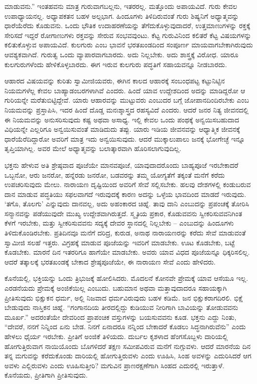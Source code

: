 ಮಾಡುವನು.” ಇಂತಹವನು ಮಾತ್ರ ಗುರುವಾಗಬಲ್ಲನು, ಇತರರಲ್ಲ. ಮತ್ತೊಂದು ಅಪಾಯವಿದೆ. ಗುರು ಕೇವಲ ಉಪಾಧ್ಯಾಯನಲ್ಲ. ಅಧ್ಯಾಪಕತನ ಬಹಳ ಅಲ್ಪಭಾಗ. ಹಿಂದೂಗಳು ತಿಳಿದಿರುವಂತೆ ಗುರು ಶಿಷ್ಯನಿಗೆ ಅಧ್ಯಾತ್ಮವನ್ನು ಧಾರೆಯೆರೆದು ಕೊಡುವನು. ಒಂದು ಭೌತಿಕ ಉದಾಹರಣೆಯನ್ನು ತೆಗೆದುಕೊಳ್ಳುವುದಾದರೆ, ಉತ್ತಮಾಣುಗಳನ್ನು ರಕ್ತಕ್ಕೆ ಸೇರಿಸದೆ ಇದ್ದರೆ ರೋಗಾಣುಗಳು ರಕ್ತವನ್ನು ಸೇರುವ ಸಂಭವವುಂಟು. ಕೆಟ್ಟ ಗುರುವಿನಿಂದ ಕಲಿತರೆ ಕೆಟ್ಟ ವಿಷಯಗಳನ್ನು ಕಲಿತುಕೊಳ್ಳುವ ಅಪಾಯವಿದೆ. ಕುಲಗುರು ಎಂಬ ಭಾವನೆ ಭರತಖಂಡದಿಂದ ಸಂಪೂರ್ಣ ಮಾಯವಾಗಬೇಕಾಗಿರುವುದು ಆವಶ್ಯಕವಾಗಿದೆ. ಗುರುತ್ವ ಒಂದು ವ್ಯಾಪಾರವಾಗಬಾರದು. ಅದು ನಿಲ್ಲಬೇಕು. ಅದು ಶಾಸ್ತ್ರಕ್ಕೆ ವಿರೋಧ. ಯಾರೂ ಕುಲಗುರುಗಳೆಂದು ಹೇಳಿಕೊಳ್ಳಬಾರದು. ಈಗ ಇರುವ ಕುಲಗುರು ಪದ್ಧತಿಗೆ ಸಹಾಯವನ್ನೂ ನೀಡಬಾರದು.

ಆಹಾರದ ವಿಷಯವನ್ನು ಕುರಿತು ಸ್ವಾಮೀಜಿಯವರು, ಈಗಿನ ಕಾಲದ ಆಹಾರಕ್ಕೆ ಸಂಬಂಧಪಟ್ಟ ಕಟ್ಟುನಿಟ್ಟಿನ ನಿಯಮಗಳೆಲ್ಲ ಕೇವಲ ಬಾಹ್ಯಾಡಂಬರಗಳಾಗಿವೆ ಎಂದರು. ಹಿಂದೆ ಯಾವ ಉದ್ದೇಶದಿಂದ ಅದನ್ನು ಮಾಡಿದ್ದರೋ ಆ ಗುರಿಯನ್ನೇ ಮರೆತುಬಿಟ್ಟಿದ್ದೇವೆ. ಯಾರು ಆಹಾರವನ್ನು ಮುಟ್ಟುವರು ಎಂಬುದರ ಬಗ್ಗೆ ಜೋಪಾನದಿಂದಿರಬೇಕು ಎಂಬ ನಿಯಮವನ್ನು ಪ್ರಸ್ತಾಪಿಸಿ, ಇದರ ಹಿಂದೆ ದೊಡ್ಡ ಮನಃಶ್ಶಾಸ್ತ್ರದ ರಹಸ್ಯವಿದೆ ಎಂದರು. ಆದರೆ ಜನರ ನಿತ್ಯ ಜೀವನದಲ್ಲಿ ಈ ನಿಯಮವನ್ನು ಅನುಸರಿಸುವುದು ಕಷ್ಟ ಅಥವಾ ಅಸಾಧ್ಯ. ಇಲ್ಲಿ ಕೇವಲ ಒಂದು ಪಂಥಕ್ಕೆ ಅನ್ವಯಿಸಬಹುದಾದ ವಿಧಿಯನ್ನೇ ಎಲ್ಲರಿಗೂ ಅನ್ವಯಿಸುವಂತೆ ಮಾಡಿದುದು ತಪ್ಪು. ಯಾರು ಇಡಿಯ ಜೀವನವನ್ನು ಆಧ್ಯಾತ್ಮಿಕ ಜೀವನಕ್ಕೆ ಧಾರೆಯೆರೆದಿದ್ದಾರೋ ಅವರಿಗೆ ಮಾತ್ರ ಇದು ಅನ್ವಯಿಸುವುದು. ಆದರೆ ಮುಕ್ಕಾಲುಪಾಲು ಜನಕ್ಕೆ ಭೋಗೇಚ್ಛೆ ಇನ್ನೂ ತೃಪ್ತಿಯಾಗಿಲ್ಲ. ಅವರ ಮೇಲೆ ಅಧ್ಯಾತ್ಮವನ್ನು ಬಲಾತ್ಕಾರವಾಗಿ ಹೊರಿಸಲಾಗುವುದಿಲ್ಲ.

ಭಕ್ತನು ಹೇಳುವ ಅತಿ ಶ್ರೇಷ್ಠವಾದ ಪೂಜೆಯೇ ಮಾನವಪೂಜೆ, ಯಾವುದಾದರೊಂದು ಬಾಹ್ಯಪೂಜೆ ಇರಬೇಕಾದರೆ ಒಬ್ಬನೋ, ಆರು ಜನರೋ, ಹನ್ನೆರಡು ಜನರೋ, ಬಡವರನ್ನು ತಮ್ಮ ಯೋಗ್ಯತೆಗೆ ತಕ್ಕಂತೆ ಮನೆಗೆ ಕರೆದು ಉಪಚರಿಸುವುದು ಮೇಲು. ನಾರಾಯಣ ದೃಷ್ಟಿಯಿಂದ ಅವರಿಗೆ ಸೇವೆ ಸಲ್ಲಿಸಬೇಕು. ಹಲವು ದೇಶಗಳಲ್ಲಿ ಕಂಡುಬರುವ ದಾನ ಮಾಡುವ ಪದ್ಧತಿಯು ಸಫಲವಾಗದೆ ಇರುವುದಕ್ಕೆ ಕಾರಣ ಅದನ್ನು ಒಳ್ಳೆಯ ಭಾವದಿಂದ ಮಾಡದೆ ಇರುವುದು. ‘ತಗೊ, ತೊಲಗು’ ಎನ್ನುವುದು ದಾನವಲ್ಲ, ಅದು ಅಹಂಕಾರದ ಚಿಹ್ನೆ. ತಾವು ದಾನಿ ಎಂಬುದನ್ನು ಪ್ರಪಂಚಕ್ಕೆ ತೋರಿಸಿ ಸನ್ಮಾನವನ್ನು ಪಡೆಯುವುದೇ ಮುಖ್ಯ ಉದ್ದೇಶವಾಗಿರುತ್ತದೆ. ಸ್ಮೃತಿಯ ಪ್ರಕಾರ, ಕೊಡುವವನು ಸ್ವೀಕರಿಸುವವನಿಗಿಂತ ಕೆಳಗೆ ಇರಬೇಕು, ಮತ್ತು ಸ್ವೀಕರಿಸುವವನು ಸದ್ಯಕ್ಕೆ ದೇವರ ಸ್ಥಾನದಲ್ಲಿ ನಿಲ್ಲಬೇಕು – ಎಂಬುದನ್ನು ಹಿಂದೂಗಳು ತಿಳಿದುಕೊಂಡಿರಬೇಕು. ಪ್ರತಿದಿನವೂ ಮನೆಗೆ ದರಿದ್ರ, ಕುರುಡ, ಅನಾಥ ನಾರಾಯಣರನ್ನು ಕರೆದು ಸೇವೆ ಮಾಡುವಂತೆ ಸ್ವಾಮೀಜಿ ಸಲಹೆ ಇತ್ತರು. ವಿಗ್ರಹಕ್ಕೆ ಮಾಡುವ ಪೂಜೆಯನ್ನು ಇವರಿಗೆ ಮಾಡಬೇಕು. ಊಟ ಕೊಡಬೇಕು, ಬಟ್ಟೆ ಕೊಡಬೇಕು. ಮಾರನೆ ದಿನ ಇತರರಿಗೂ ಹಾಗೆಯೇ ಮಾಡಬೇಕು. ಅವರು ಯಾವ ವಿಧದ ಪೂಜೆಯನ್ನೂ ಧಿಕ್ಕರಿಸಲಿಲ್ಲ. ಆದರೆ ತತ್ಕಾಲಕ್ಕೆ ಭರತಖಂಡಕ್ಕೆ ಬೇಕಾದ ಶ್ರೇಷ್ಠಪೂಜೆಯೇ, ಈ ನಾರಾಯಣ ಸೇವೆ ಎಂದು ಹೇಳಿದರು.

ಕೊನೆಯಲ್ಲಿ, ಭಕ್ತಿಯನ್ನು ಒಂದು ತ್ರಿಭುಜಕ್ಕೆ ಹೋಲಿಸಿದರು. ಮೊದಲನೆ ಕೋನವೇ ಪ್ರೇಮಕ್ಕೆ ಯಾವ ಆಸೆಯೂ ಇಲ್ಲ. ಎರಡನೆಯದು ಪ್ರೇಮಕ್ಕೆ ಅಂಜಿಕೆಯಿಲ್ಲ ಎಂಬುದು. ಬಹುಮಾನ ಅಥವಾ ಮತ್ತಾವುದಾದರೂ ಸಹಾಯಕ್ಕಾಗಿ ಪ್ರೀತಿಸುವುದು ಭಿಕ್ಷುಕನ ಧರ್ಮ, ಅಲ್ಲಿ ನಿಜವಾದ ಧರ್ಮವಿರುವುದು ಬಹಳ ಕಡಿಮೆ. ಜನ ಭಿಕ್ಷುಕರಾಗದಿರಲಿ. ಭಿಕ್ಷೆ ಬೇಡುವುದು ನಾಸ್ತಿಕನ ಚಿಹ್ನೆ. “ಗಂಗಾನದಿಯ ತೀರದಲ್ಲಿದ್ದು ಕುಡಿಯುವ ನೀರಿಗಾಗಿ ಬಾವಿಯನ್ನು ತೋಡುವವನು ಮೂರ್ಖ.” ಅದರಂತೆಯೇ ದೇವರಿಂದ ಪ್ರಾಪಂಚಿಕ ವಸ್ತುಗಳನ್ನು ಬಯಸುವವನು ಕೂಡ. ಭಕ್ತನು ಎದ್ದು ನಿಂತು, “ದೇವರೆ, ನನಗೆ ನಿನ್ನಿಂದ ಏನು ಬೇಡ. ನಿನಗೆ ಏನಾದರೂ ನನ್ನಿಂದ ಬೇಕಾದರೆ ಕೊಡಲು ಸಿದ್ಧನಾಗಿರುವೆನು” ಎಂದು ಹೇಳಲು ಧೈರ್ಯ ಇರಬೇಕು. ಪ್ರೀತಿಗೆ ಅಂಜಿಕೆ ತಿಳಿಯದು. ದುರ್ಬಲ ಕೃಶಳಾದ ಹೆಂಗಸೊಬ್ಬಳು ದಾರಿಯಲ್ಲಿ ಹೋಗುತ್ತಿರುವಾಗ ನಾಯಿಯೊಂದು ಬೊಗಳಿದರೆ ತಕ್ಷಣ ಸಮೀಪವಿರುವ ಮನೆಗೆ ನುಗ್ಗುವಳು. ಆದರೆ ಮಾರನೆಯ ದಿನ ತನ್ನ ಮಗುವನ್ನು ಕರೆದುಕೊಂಡು ದಾರಿಯಲ್ಲಿ ಹೋಗುತ್ತಿರುವಳು ಎಂದು ಊಹಿಸಿ, ಸಿಂಹ ಅವಳನ್ನು ಎದುರಿಸಿದರೆ ಆಗ ಅವಳು ಎಲ್ಲಿರುವಳು ಎಂದು ಊಹಿಸುತ್ತೀರಿ? ಮಗುವಿನ ಪ್ರಾಣರಕ್ಷಣೆಗಾಗಿ ಸಿಂಹದ ಎದುರಲ್ಲಿ ಇರುತ್ತಾಳೆ. ಕೊನೆಯದು, ಪ್ರೀತಿಗಾಗಿ ಪ್ರೀತಿಸುವುದು.

